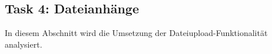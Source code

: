 \subsection{Task 4: Dateianhänge}
\label{subsec:results_t4}

In diesem Abschnitt wird die Umsetzung der Dateiupload-Funktionalität analysiert.

%
